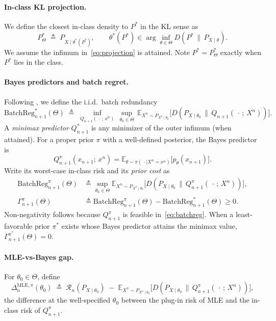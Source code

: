 \paragraph{In-class KL projection.}
We define the closest in-class density to $P^*$ in the KL sense as
\begin{equation}
P^*_\Theta \;\triangleq\; P_{X\mid\theta^*(P^*)},
\qquad
\theta^*(P^*) \in \arg\!\inf_{\theta\in\Theta} D\!\left(P^*\,\big\|\,P_{X\mid\theta}\right).
\label{eq:projection}
\end{equation}
We assume the infimum in~\eqref{eq:projection} is attained.
Note $P^*=P^*_\Theta$ exactly when
$P^*$ lies in the class.

\paragraph{Bayes predictors and batch regret.}
Following \citet{polyanskiy-wu}, we define the i.i.d.\ batch redundancy
\begin{equation}
\mathrm{BatchReg}^*_{n+1}(\Theta) \;\triangleq\;
\inf_{Q_{n+1}(\,\cdot\,;\,x^n)} \,\sup_{\theta_0\in\Theta}\,
\mathbb{E}_{X^n\sim P_{X^n\mid\theta_0}}\!\Big[D\!\left(P_{X\mid\theta_0}\,\big\|\,Q_{n+1}(\,\cdot\,;\,X^n)\right)\Big].
\label{eq:batchreg}
\end{equation}
A \emph{minimax predictor} $Q^*_{n+1}$ is any minimizer of the outer infimum
(when attained). For a proper
prior $\pi$ with a well-defined posterior, the Bayes predictor is
\begin{equation}
Q^\pi_{n+1}(x_{n+1};\,x^n)
= \mathbb{E}_{\theta\sim\pi(\,\cdot\mid X^n=x^n)}
   \!\big[p_\theta(x_{n+1})\big].
\label{eq:bayesmix}
\end{equation}
Write its worst-case in-class risk and its \emph{prior cost} as
\begin{align}
\mathrm{BatchReg}^\pi_{n+1}(\Theta)
&\triangleq \sup_{\theta_0\in\Theta}
\mathbb{E}_{X^n\sim P_{X^n\mid\theta_0}}
\!\Big[D\!\left(P_{X\mid\theta_0}\,\big\|\,Q^\pi_{n+1}(\,\cdot\,;\,X^n)\right)\Big],
\label{eq:prior-risk}\\
\Gamma^\pi_{n+1}(\Theta)
&\triangleq \mathrm{BatchReg}^\pi_{n+1}(\Theta)
-\mathrm{BatchReg}^*_{n+1}(\Theta)\ge 0.
\label{eq:prior-cost}
\end{align}
Non-negativity follows because $Q^\pi_{n+1}$ is feasible in~\eqref{eq:batchreg}.
When a least-favorable prior $\pi^*$ exists whose Bayes predictor attains
the minimax value, $\Gamma^{\pi^*}_{n+1}(\Theta)=0$.

\paragraph{MLE-vs-Bayes gap.}
For $\theta_0\in\Theta$, define
\begin{equation}
\Delta^{\mathrm{MLE},\pi}_n(\theta_0)
\;\triangleq\;
\mathcal{R}_n(P_{X\mid\theta_0})
\;-\;
\mathbb{E}_{X^n\sim P_{X^n\mid\theta_0}}\!\Big[D\!\left(P_{X\mid\theta_0}\,\big\|\,Q^\pi_{n+1}(\,\cdot\,;\,X^n)\right)\Big],
\label{eq:DeltaMLE}
\end{equation}
the difference at the well-specified $\theta_0$ between the plug-in risk of MLE
and the in-class risk of $Q^\pi_{n+1}$.


